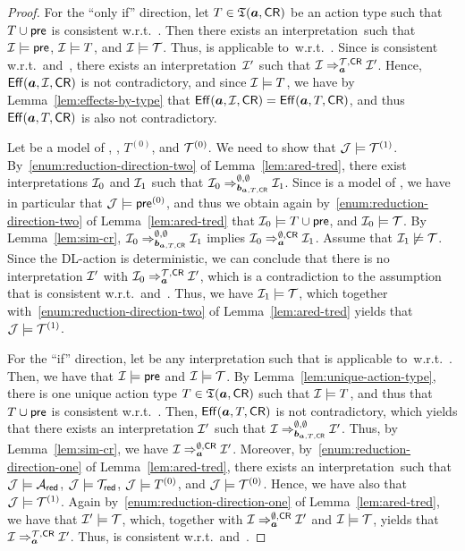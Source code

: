 \begin{proof}
    For the \enquote{only if} direction, let $T\in\mathfrak{T}(\boldsymbol a,\mathsf{CR})$ be an action
    type such that $T\cup\mathsf{pre}$ is consistent w.r.t.~\Tmc.  Then there exists an
    interpretation~\Imc such that $\mathcal{I}\models\mathsf{pre}$, $\mathcal{I}\models T$, and
    $\mathcal{I}\models\mathcal{T}$.  Thus, \abf is applicable to~\Imc w.r.t.~\Tmc.  Since
    \abf is consistent w.r.t.~\Tmc and~\CR, there exists an
    interpretation~$\mathcal{I}'$ such that $\mathcal{I}\Rightarrow_{\boldsymbol a}^{\mathcal{T},\mathsf{CR}}\mathcal{I}'$.
    Hence, $\operatorname{\mathsf{Eff}}(\boldsymbol a,\mathcal{I},\mathsf{CR})$ is not contradictory, and since $\mathcal{I}\models
    T$, we have by Lemma~\ref{lem:effects-by-type} that
    $\operatorname{\mathsf{Eff}}(\boldsymbol a,\mathcal{I},\mathsf{CR})=\operatorname{\mathsf{Eff}}(\boldsymbol a,T,\mathsf{CR})$, and thus $\operatorname{\mathsf{Eff}}(\boldsymbol a,T,\mathsf{CR})$ is also
    not contradictory.

    Let \Jmc be a model of \Ared, \Tred, $T^{(0)}$, and $\mathcal{T}^{(0)}$.  We need
    to show that $\mathcal{J}\models\mathcal{T}^{(1)}$.
    By~\eqref{enum:reduction-direction-two} of Lemma~\ref{lem:ared-tred},
    there exist interpretations $\mathcal{I}_0$ and $\mathcal{I}_1$ such that
    $\mathcal{I}_0\Rightarrow_{\boldsymbol b_{\boldsymbol a,T,\mathsf{CR}}}^{\emptyset,\emptyset}\mathcal{I}_1$.  Since
    \Jmc is a model of \Ared, we have in particular that
    $\mathcal{J}\models\mathsf{pre}^{(0)}$, and thus we obtain again
    by~\eqref{enum:reduction-direction-two} of Lemma~\ref{lem:ared-tred} that
    $\mathcal{I}_0\models T\cup\mathsf{pre}$, and $\mathcal{I}_0\models\mathcal{T}$.  By
    Lemma~\ref{lem:sim-cr},
    $\mathcal{I}_0\Rightarrow_{\boldsymbol b_{\boldsymbol a,T,\mathsf{CR}}}^{\emptyset,\emptyset}\mathcal{I}_1$ implies
    $\mathcal{I}_0\Rightarrow_{\boldsymbol a}^{\emptyset,\mathsf{CR}}\mathcal{I}_1$.  Assume that
    $\mathcal{I}_1\not\models\mathcal{T}$.  Since the DL-action \abf is deterministic, we can
    conclude that there is no interpretation $\mathcal{I}'$ with
    $\mathcal{I}_0\Rightarrow_{\boldsymbol a}^{\mathcal{T},\mathsf{CR}}\mathcal{I}'$, which is a contradiction to the
    assumption that \abf is consistent w.r.t.~\Tmc and~\CR.
    Thus, we have $\mathcal{I}_1\models\mathcal{T}$, which together
    with~\eqref{enum:reduction-direction-two} of Lemma~\ref{lem:ared-tred}
    yields that $\mathcal{J}\models\mathcal{T}^{(1)}$.

    For the \enquote{if} direction, let \Imc be any interpretation such that
    \abf is applicable to~\Imc w.r.t.~\Tmc.  Then, we have that
    $\mathcal{I}\models\mathsf{pre}$ and $\mathcal{I}\models\mathcal{T}$.  By
    Lemma~\ref{lem:unique-action-type}, there is one unique action type
    $T\in\mathfrak{T}(\boldsymbol a,\mathsf{CR})$ such that $\mathcal{I}\models T$, and thus that $T\cup\mathsf{pre}$ is
    consistent w.r.t.~\Tmc.  Then, $\operatorname{\mathsf{Eff}}(\boldsymbol a,T,\mathsf{CR})$ is not contradictory,
    which yields that there exists an interpretation $\mathcal{I}'$ such that
    $\mathcal{I}\Rightarrow_{\boldsymbol b_{\boldsymbol a,T,\mathsf{CR}}}^{\emptyset,\emptyset}\mathcal{I}'$.
    Thus, by Lemma~\ref{lem:sim-cr}, we have
    $\mathcal{I}\Rightarrow_{\boldsymbol a}^{\emptyset,\mathsf{CR}}\mathcal{I}'$.  Moreover,
    by~\eqref{enum:reduction-direction-one} of Lemma~\ref{lem:ared-tred}, there
    exists an interpretation~\Jmc such that $\mathcal{J}\models\mathcal{A}_\mathsf{red}$,
    $\mathcal{J}\models\mathcal{T}_\mathsf{red}$, $\mathcal{J}\models T^{(0)}$, and $\mathcal{J}\models\mathcal{T}^{(0)}$.
    Hence, we have also that $\mathcal{J}\models\mathcal{T}^{(1)}$.  Again
    by~\eqref{enum:reduction-direction-one} of Lemma~\ref{lem:ared-tred}, we
    have that $\mathcal{I}'\models\mathcal{T}$, which, together with
    $\mathcal{I}\Rightarrow_{\boldsymbol a}^{\emptyset,\mathsf{CR}}\mathcal{I}'$ and $\mathcal{I}\models\mathcal{T}$, yields
    that $\mathcal{I}\Rightarrow_{\boldsymbol a}^{\mathcal{T},\mathsf{CR}}\mathcal{I}'$.  Thus, \abf is consistent
    w.r.t.~\Tmc and~\CR.
\end{proof}

